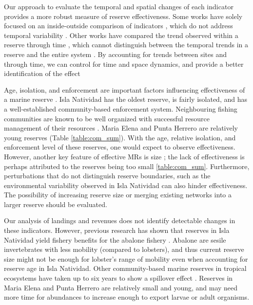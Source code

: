 \documentclass{frontiersSCNS}
\theoremstyle{definition}
\theoremstyle{definition}
\theoremstyle{definition}
\theoremstyle{remark}
\begin{document}
Our approach to evaluate the temporal and spatial changes of each
indicator provides a more robust measure of reserve effectiveness. Some
works have solely focused on an inside-outside comparison of indicators
\citep{guidetti_2014-8Z,friedlander_2017-oI,rodriguez_2017-PD}, which do
not address temporal variability \citep{depalma_2018}. Other works have
compared the trend observed within a reserve through time
\citep{betti_2017-lq}, which cannot distinguish between the temporal
trends in a reserve and the entire system \citep{depalma_2018}. By
accounting for trends between sites and through time, we can control for
time and space dynamics, and provide a better identification of the
effect

Age, isolation, and enforcement are important factors influencing
effectiveness of a marine reserve \citep{edgar_2014-UO}. Isla Natividad
has the oldest reserve, is fairly isolated, and has a well-established
community-based enforcement system. Neighbouring fishing communities are
known to be well organized with successful resource management of their
resources \citep{mccay_2017-1m,mccay_2014-CN}. Maria Elena and Punta
Herrero are relatively young reserves (Table \ref{table:com_sum}). With
the age, relative isolation, and enforcement level of these reserves,
one would expect to observe effectiveness. However, another key feature
of effective MRs is size \citep{edgar_2014-UO}; the lack of
effectiveness is perhaps attributed to the reserves being too small
\ref{table:com_sum}. Furthermore, perturbations that do not distinguish
reserve boundaries, such as the environmental variability observed in
Isla Natividad can also hinder effectiveness. The possibility of
increasing reserve size or merging existing networks into a larger
reserve should be evaluated.

Our analysis of landings and revenues does not identify detectable
changes in these indicators. However, previous research has shown that
reserves in Isla Natividad yield fishery benefits for the abalone
fishery \citep{rossetto_2015-V0}. Abalone are sesile invertebrates with
less mobility (compared to lobsters), and thus current reserve size
might not be enough for lobster's range of mobility even when accounting
for reserve age in Isla Natividad. Other community-based marine reserves
in tropical ecosystems have taken up to six years to show a spillover
effect \citep{dasilva_2015-zX}. Reserves in Maria Elena and Punta
Herrero are relatively small and young, and may need more time for
abundances to increase enough to export larvae or adult organisms.
\end{document}
